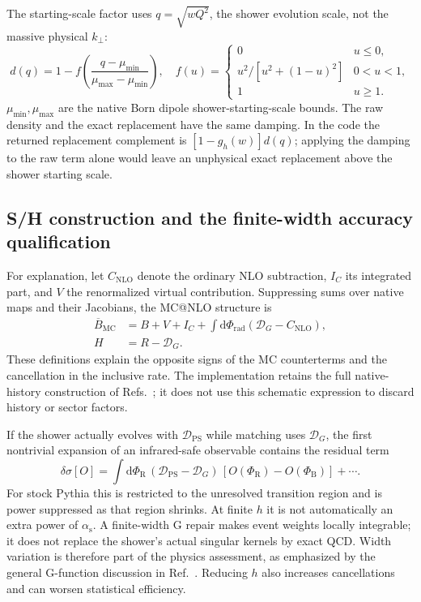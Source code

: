 \documentclass[11pt,a4paper]{article}
\newcommand{\dd}{\mathrm{d}}
\newcommand{\as}{\alpha_{\mathrm{s}}}
\newcommand{\kt}{k_{\perp}}
\newcommand{\Born}{\Phi_{\mathrm{B}}}
\newcommand{\Real}{\Phi_{\mathrm{R}}}
\newcommand{\Dps}{\mathcal{D}_{\mathrm{PS}}}
\newcommand{\DG}{\mathcal{D}_{G}}
\begin{document}
The starting-scale factor uses $q=\sqrt{wQ^2}$, the shower evolution scale,
not the massive physical $\kt$:
\begin{equation}
 d(q)=1-f\left(\frac{q-\mu_{\min}}{\mu_{\max}-\mu_{\min}}\right),
 \quad
 f(u)=\begin{cases}0&u\leq0,\\
 u^2/[u^2+(1-u)^2]&0<u<1,\\1&u\geq1.
 \end{cases}
\end{equation}
$\mu_{\min},\mu_{\max}$ are the native Born dipole shower-starting-scale
bounds. The raw density and the exact replacement have the same damping.
In the code the returned replacement complement is
$[1-g_h(w)]d(q)$; applying the damping to the raw term alone would leave an
unphysical exact replacement above the shower starting scale.

\subsection{S/H construction and the finite-width accuracy qualification}

For explanation, let $C_{\mathrm{NLO}}$ denote the ordinary NLO subtraction,
$I_C$ its integrated part, and $V$ the renormalized virtual contribution.
Suppressing sums over native maps and their Jacobians, the MC@NLO structure is
\begin{align}
 \overline B_{\mathrm{MC}}
 &=B+V+I_C+\int\dd\Phi_{\mathrm{rad}}
                     (\DG-C_{\mathrm{NLO}}),\\
 H&=R-\DG.
\end{align}
These definitions explain the opposite signs of the MC counterterms and
the cancellation in the inclusive rate. The implementation retains the full
native-history construction of Refs.~\cite{MCatNLO,MG5}; it does not use this
schematic expression to discard history or sector factors.

If the shower actually evolves with $\Dps$ while matching uses $\DG$, the
first nontrivial expansion of an infrared-safe observable contains the
residual term
\begin{equation}
 \delta\sigma[O]=\int\dd\Real\,
  (\Dps-\DG)\,[O(\Real)-O(\Born)]+\cdots.\label{eq:Gpower}
\end{equation}
For stock Pythia this is restricted to the unresolved transition region and
is power suppressed as that region shrinks. At finite $h$ it is not
automatically an extra power of $\as$. A finite-width G repair makes event
weights locally integrable; it does not replace the shower's actual
singular kernels by exact QCD. Width variation is therefore part of the
physics assessment, as emphasized by the general G-function discussion in
Ref.~\cite{MG5}. Reducing $h$ also increases cancellations and can worsen
statistical efficiency.
\end{document}
